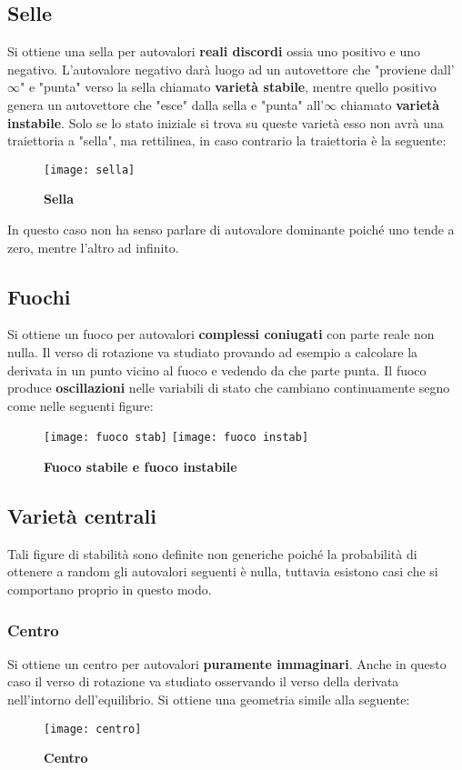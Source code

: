 \documentclass[a4paper]{article}
\begin{document}
	\subsection{Selle}
	Si ottiene una sella per autovalori \textbf{reali discordi} ossia uno positivo e uno negativo. L'autovalore negativo darà luogo ad un autovettore che "proviene dall'$\infty$" e "punta" verso la sella chiamato \textbf{varietà stabile}, mentre quello positivo genera un autovettore che "esce" dalla sella e "punta" all'$\infty$ chiamato \textbf{varietà instabile}. Solo se lo stato iniziale si trova su queste varietà esso non avrà una traiettoria a "sella", ma rettilinea, in caso contrario la traiettoria è la seguente:
	\begin{figure}[H]
		\centering
		\texttt{[image: sella]}%
		\caption{\textbf{Sella}}
	\end{figure}
	In questo caso non ha senso parlare di autovalore dominante poiché uno tende a zero, mentre l'altro ad infinito.
	\subsection{Fuochi}
	Si ottiene un fuoco per autovalori \textbf{complessi coniugati} con parte reale non nulla. Il verso di rotazione va studiato provando ad esempio a calcolare la derivata in un punto vicino al fuoco e vedendo da che parte punta. Il fuoco produce \textbf{oscillazioni} nelle variabili di stato che cambiano continuamente segno come nelle seguenti figure:
	\begin{figure}[htbp]
		\centering
		\texttt{[image: fuoco stab]}%
		\quad\quad
		\texttt{[image: fuoco instab]}
		\caption{\textbf{Fuoco stabile e fuoco instabile}}
	\end{figure}
	
	\subsection{Varietà centrali}
	Tali figure di stabilità sono definite non generiche poiché la probabilità di ottenere a random gli autovalori seguenti è nulla, tuttavia esistono casi che si comportano proprio in questo modo.
	\subsubsection{Centro}
	Si ottiene un centro per autovalori \textbf{puramente immaginari}. Anche in questo caso il verso di rotazione va studiato osservando il verso della derivata nell'intorno dell'equilibrio. Si ottiene una geometria simile alla seguente: 
		\begin{figure}[H]
		\centering
		\texttt{[image: centro]}%
		\caption{\textbf{Centro}}
	\end{figure}
\end{document}
